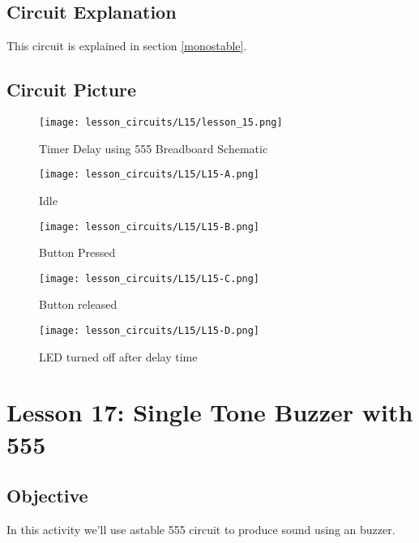 \subsection{Circuit Explanation}
This circuit is explained in section \ref{monostable}.
\subsection{Circuit Picture}
\begin{figure}[!htp]
    \centering
    \texttt{[image: lesson\_circuits/L15/lesson\_15.png]}
    \caption{Timer Delay using 555 Breadboard Schematic}
    \label{fig:555_timer_sch}
\end{figure}
\begin{figure}[!htp]
    \centering
    \texttt{[image: lesson\_circuits/L15/L15-A.png]}
    \caption{Idle}
    \label{fig:555_timer_obb}
\end{figure}
\begin{figure}[!htp]
    \centering
    \texttt{[image: lesson\_circuits/L15/L15-B.png]}
    \caption{Button Pressed}
    \label{fig:555_timer_obb1}
\end{figure}
\begin{figure}[!htp]
    \centering
    \texttt{[image: lesson\_circuits/L15/L15-C.png]}
    \caption{Button released}
    \label{fig:555_timer_obb2}
\end{figure}
\begin{figure}[!htp]
    \centering
    \texttt{[image: lesson\_circuits/L15/L15-D.png]}
    \caption{LED turned off after delay time}
    \label{fig:555_timer_obb3}
\end{figure}
\section{Lesson 17: Single Tone Buzzer with 555}
\subsection{Objective}
In this activity we'll use astable 555 circuit to produce sound using an buzzer.
